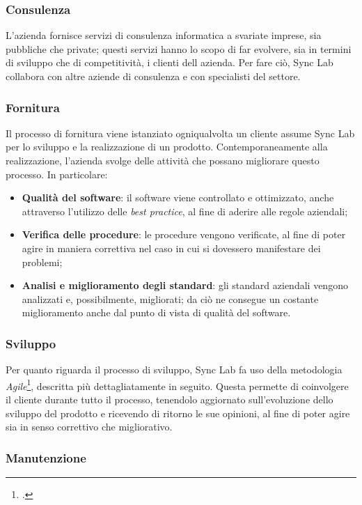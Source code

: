 \subsubsection*{Consulenza}

L'azienda fornisce servizi di consulenza informatica a svariate imprese, sia pubbliche che private; questi servizi hanno lo scopo di far evolvere, sia in termini di sviluppo che di competitività, i clienti dell azienda. Per fare ciò, Sync Lab collabora con altre aziende di consulenza e con specialisti del settore.

\subsubsection*{Fornitura}

Il processo di fornitura viene istanziato ogniqualvolta un cliente assume Sync Lab per lo sviluppo e la realizzazione di un prodotto. Contemporaneamente alla realizzazione, l'azienda svolge delle attività che possano migliorare questo processo. In particolare:
\begin{itemize}
  \item \textbf{Qualità del software}: il software viene controllato e ottimizzato, anche attraverso l'utilizzo delle \textit{best practice}, al fine di aderire alle regole aziendali;
  \item \textbf{Verifica delle procedure}: le procedure vengono verificate, al fine di poter agire in maniera correttiva nel caso in cui si dovessero manifestare dei problemi;
  \item \textbf{Analisi e miglioramento degli standard}: gli standard aziendali vengono analizzati e, possibilmente, migliorati; da ciò ne consegue un costante miglioramento anche dal punto di vista di qualità del software.
\end{itemize}

\subsubsection*{Sviluppo}

Per quanto riguarda il processo di sviluppo, Sync Lab fa uso della metodologia \textit{Agile}\footcite{tec:agile}, descritta più dettagliatamente in seguito. Questa permette di coinvolgere il cliente durante tutto il processo, tenendolo aggiornato sull'evoluzione dello sviluppo del prodotto e ricevendo di ritorno le sue opinioni, al fine di poter agire sia in senso correttivo che migliorativo.

\subsubsection*{Manutenzione}

